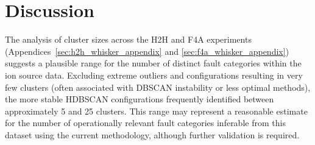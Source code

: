 \documentclass[10pt,oneside]{report}
\begin{document}
 

\section{Discussion}\label{sec:discussion} 

The analysis of cluster sizes across the H2H and F4A experiments (Appendices~\ref{sec:h2h_whisker_appendix} and \ref{sec:f4a_whisker_appendix}) suggests a plausible range for the number of distinct fault categories within the ion source data. Excluding extreme outliers and configurations resulting in very few clusters (often associated with DBSCAN instability or less optimal methods), the more stable HDBSCAN configurations frequently identified between approximately 5 and 25 clusters. This range may represent a reasonable estimate for the number of operationally relevant fault categories inferable from this dataset using the current methodology, although further validation is required.
\end{document}
